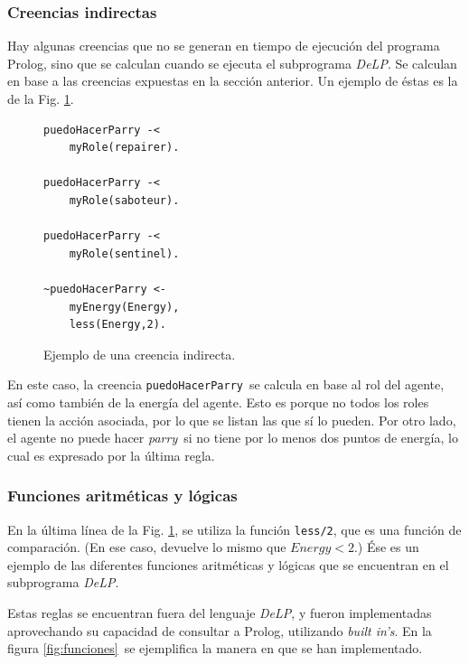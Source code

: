 \documentclass[oneside]{book}
\theoremstyle{definition}
\theoremstyle{example}
\begin{document}
\subsubsection{Creencias indirectas}

\label{sec:creeciasIndirectas}

Hay algunas creencias que no se generan en tiempo de ejecución del programa Prolog, sino
que se calculan cuando se ejecuta el subprograma \textit{DeLP}. Se calculan en base a las creencias
expuestas en la sección anterior. Un ejemplo de éstas es la de la Fig. 
\ref{fig:creenciaIndirecta}.

\begin{figure}
\begin{verbatim}
puedoHacerParry -<
    myRole(repairer).

puedoHacerParry -<
    myRole(saboteur).

puedoHacerParry -<
    myRole(sentinel).

~puedoHacerParry <-
    myEnergy(Energy),
    less(Energy,2).
\end{verbatim}

\caption{Ejemplo de una creencia indirecta.}
\label{fig:creenciaIndirecta}

\end{figure}

En este caso, la creencia \texttt{puedoHacerParry}\ se calcula en base al rol del 
agente,
así como también de la energía del agente. Esto es porque no todos los roles tienen la
acción asociada, por lo que se listan las que sí lo pueden. Por otro lado, el agente
no puede hacer \textit{parry}\ si no tiene por lo menos dos puntos de energía, lo cual
es expresado por la última regla.

\subsubsection{Funciones aritméticas y lógicas}

En la última línea de la Fig. \ref{fig:creenciaIndirecta}, se utiliza la función 
\texttt{less/2}, que es una función de comparación. (En ese caso, devuelve lo mismo
que $Energy < 2$.) Ése es un ejemplo de las diferentes funciones aritméticas y 
lógicas que se encuentran en el subprograma \textit{DeLP}.

Estas reglas se encuentran fuera del lenguaje \textit{DeLP}, y fueron implementadas 
aprovechando su capacidad de consultar a Prolog, utilizando \textit{built in's}.
En la figura \ref{fig:funciones}\ se ejemplifica la manera en que se han 
implementado.
\end{document}
